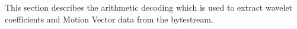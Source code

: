 This section describes the arithmetic decoding which is
used to extract wavelet coefficients and Motion Vector data from the
bytestream.


